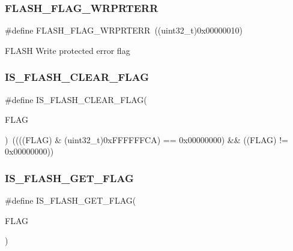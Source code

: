 \subsubsection{\texorpdfstring{FLASH\_FLAG\_WRPRTERR}{FLASH\_FLAG\_WRPRTERR}}
{\footnotesize\ttfamily \#define F\+L\+A\+S\+H\+\_\+\+F\+L\+A\+G\+\_\+\+W\+R\+P\+R\+T\+E\+RR~((uint32\+\_\+t)0x00000010)}

F\+L\+A\+SH Write protected error flag \mbox{\label{group___f_l_a_s_h___flags_ga82f8c6104c348d6aa47c7658ed3b6b36}} 
\subsubsection{\texorpdfstring{IS\_FLASH\_CLEAR\_FLAG}{IS\_FLASH\_CLEAR\_FLAG}}
{\footnotesize\ttfamily \#define I\+S\+\_\+\+F\+L\+A\+S\+H\+\_\+\+C\+L\+E\+A\+R\+\_\+\+F\+L\+AG(\begin{DoxyParamCaption}\item[{}]{F\+L\+AG }\end{DoxyParamCaption})~((((F\+L\+AG) \& (uint32\+\_\+t)0x\+F\+F\+F\+F\+F\+F\+C\+A) == 0x00000000) \&\& ((\+F\+L\+A\+G) != 0x00000000))}

\mbox{\label{group___f_l_a_s_h___flags_ga61b60325cd94e1608e34afc7aff20ee4}} 
\subsubsection{\texorpdfstring{IS\_FLASH\_GET\_FLAG}{IS\_FLASH\_GET\_FLAG}}
{\footnotesize\ttfamily \#define I\+S\+\_\+\+F\+L\+A\+S\+H\+\_\+\+G\+E\+T\+\_\+\+F\+L\+AG(\begin{DoxyParamCaption}\item[{}]{F\+L\+AG }\end{DoxyParamCaption})}

